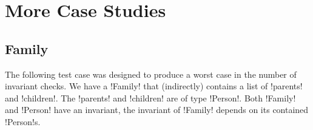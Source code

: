 

\section{More Case Studies}

\subsection{Family}
The following test case was designed to produce a worst case in the number of invariant checks. We have a \Q!Family! that (indirectly) contains a list of \Q!parents! and \Q!children!. The \Q!parents! and \Q!children! are of type \Q!Person!. Both \Q!Family! and \Q!Person! have an invariant, the invariant of \Q!Family! depends on its contained \Q!Person!s.

